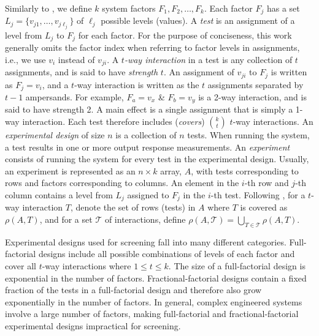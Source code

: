 Similarly to \cite{CMjoco,seidelIWOCA}, we define $k$ system factors $F_1, F_2, \dots, F_k$.
Each factor $F_j$ has a set $L_j = \{v_{j1}, \dots, v_{j{\ell_j}}\}$ of $\ell_j$ possible levels (values).
A {\em test} is an assignment of a level from $L_j$ to $F_j$ for each factor.
For the purpose of conciseness, this work generally omits the factor index when referring to factor levels in assignments, i.e., we use $v_i$ instead of $v_{ji}$.
A {\em $t$-way interaction} in a test is any collection of $t$ assignments, and is said to have {\em strength} $t$.
An assignment of $v_{ji}$ to $F_j$ is written as $F_j = v_i$, and a $t$-way interaction is written as the $t$ assignments separated by $t - 1$ ampersands.
For example, $F_a = v_x$ \& $F_b = v_y$ is a 2-way interaction, and is said to have strength 2.
A main effect is a single assignment that is simply a 1-way interaction.
Each test therefore includes ({\em covers}) $k \choose t$ $t$-way interactions.
An {\em experimental design} of size $n$ is a collection of $n$ tests.
When running the system, a test results in one or more output response measurements.
An {\em experiment} consists of running the system for every test in the experimental design.
Usually, an experiment is represented as an $n \times k$ array, $A$, with tests corresponding to rows and factors corresponding to columns.
An element in the $i$-th row and $j$-th column contains a level from $L_j$ assigned to $F_j$ in the $i$-th test.
Following \cite{CMjoco}, for a $t$-way interaction $T$, denote the set of rows (tests) in $A$ where $T$ is covered as $\rho(A,T)$, and for a set $\mathcal{T}$ of interactions, define $\rho(A,\mathcal{T}) = \bigcup_{T \in {\mathcal{T}}} \rho(A,T)$.

Experimental designs used for screening fall into many different categories.
Full-factorial designs include all possible combinations of levels of each factor \cite{Montgomery-DOE-2017} and cover all $t$-way interactions where $1 \leq t \leq k$.
The size of a full-factorial design is exponential in the number of factors.
Fractional-factorial designs contain a fixed fraction of the tests in a full-factorial design and therefore also grow exponentially in the number of factors.
In general, complex engineered systems involve a large number of factors, making full-factorial and fractional-factorial experimental designs impractical for screening.

